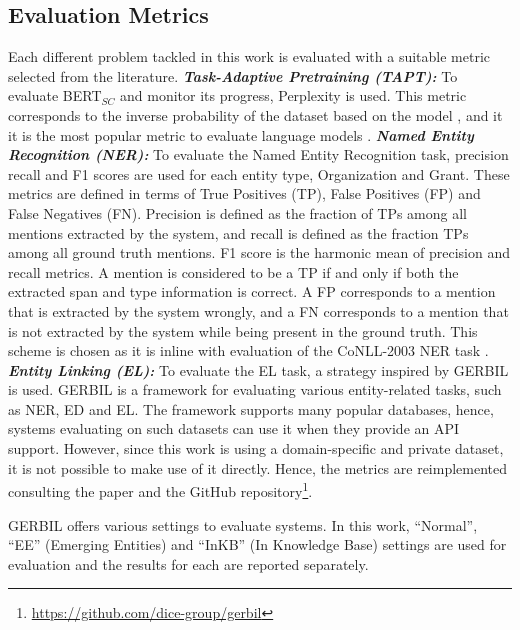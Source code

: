 \documentclass{report}
\theoremstyle{definition}
\theoremstyle{remark}
\begin{document}
\subsection{Evaluation Metrics}
\label{sec:EvalExpSetupEval}
Each different problem tackled in this work is evaluated with a suitable metric selected from the literature.
\newline
\newline
\textit{\textbf{Task-Adaptive Pretraining (TAPT):}} To evaluate BERT$_{SC}$ and monitor its progress, Perplexity is used. This metric corresponds to the inverse probability of the dataset based on the model \cite{perplexity}, and it it is the most popular metric to evaluate language models \cite{perplexity}. 
\newline
\newline
\textit{\textbf{Named Entity Recognition (NER):}} To evaluate the Named Entity Recognition task, precision recall and F1 scores are used for each entity type, Organization and Grant. These metrics are defined in terms of True Positives (TP), False Positives (FP) and False Negatives (FN). Precision is defined as the fraction of TPs among all mentions extracted by the system, and recall is defined as the fraction TPs among all ground truth mentions. F1 score is the harmonic mean of precision and recall metrics. A mention is considered to be a TP if and only if both the extracted span and type information is correct. A FP corresponds to a mention that is extracted by the system wrongly, and a FN corresponds to a mention that is not extracted by the system while being present in the ground truth. This scheme is chosen as it is inline with evaluation of the CoNLL-2003 NER task \cite{conll}.
\newline
\newline
\textit{\textbf{Entity Linking (EL):}} To evaluate the EL task, a strategy inspired by GERBIL \cite{gerbil} is used. GERBIL is a framework for evaluating various entity-related tasks, such as NER, ED and EL. The framework supports many popular databases, hence, systems evaluating on such datasets can use it when they provide an API support. However, since this work is using a domain-specific and private dataset, it is not possible to make use of it directly. Hence, the metrics are reimplemented consulting the paper \cite{gerbil} and the GitHub repository\footnote{\url{https://github.com/dice-group/gerbil}}. 

GERBIL offers various settings to evaluate systems. In this work, ``Normal'', ``EE'' (Emerging Entities) and ``InKB'' (In Knowledge Base) settings are used for evaluation and the results for each are reported separately. 
\end{document}
